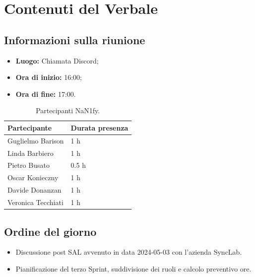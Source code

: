 \documentclass[8pt]{article}
\begin{document}
\section{Contenuti del Verbale}
\subsection{Informazioni sulla riunione}
\begin{itemize}
	\setlength\itemsep{0em}
	\item\textbf{Luogo:} Chiamata Discord;
	\item\textbf{Ora di inizio:} 16:00;
	\item\textbf{Ora di fine:} 17:00.
\end{itemize}
\begin{table}[ht!]
	\begin{minipage}[t]{0.5\linewidth}
		\centering
		\begin{tabular}{p{3cm} p{3cm}}
			\toprule
			\textbf{Partecipante} & \textbf{Durata presenza} \\
			\midrule
			Guglielmo Barison & 1 h \\
			Linda Barbiero &  1 h \\
			Pietro Busato & 0.5 h \\
			Oscar Konieczny & 1 h \\
			Davide Donanzan & 1 h \\
			Veronica Tecchiati & 1 h \\
			\bottomrule
		\end{tabular}
		\caption{Partecipanti NaN1fy.}
		\label{table:Partecipanti NaN1fy}
	\end{minipage}
\end{table}
\subsection{Ordine del giorno}
\begin{itemize}
	\setlength\itemsep{0em}
	\item Discussione post SAL avvenuto in data 2024-05-03 con l'azienda SyncLab.
	\item Pianificazione del terzo Sprint, suddivisione dei ruoli e calcolo preventivo ore.
\end{itemize}
\end{document}
